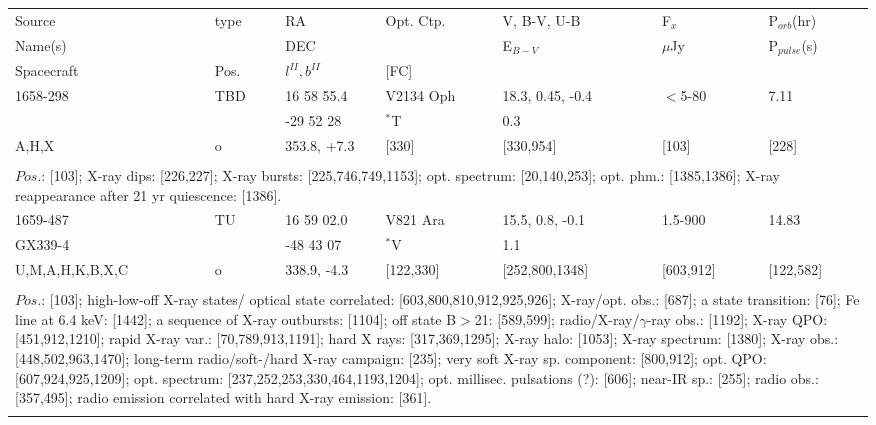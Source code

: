 \documentclass{aa}
\begin{document}
\begin{tabular}{p{2.5cm}p{1cm}p{1.8cm}p{2.3cm}p{3.3cm}p{2.0cm}p{2.2cm}}
\noalign{\smallskip}
\multicolumn{7}{p{17.5cm}}{Table 1.  (continued) }\\        
\hline
\noalign{\smallskip}
Source         & type  & RA                       &  Opt. Ctp. & V, B-V, U-B  & F$_{x}$          & P$_{orb}$(hr)    \\
Name(s)       &            & DEC                    &                     & E$_{B-V}$   & $\mu$Jy        & P$_{pulse}$(s) \\
Spacecraft & Pos.  & $l^{II}, b^{II}$      &  [FC]           &                        &                         &                             \\
\noalign{\smallskip} 
\hline

\noalign{\smallskip}
1658-298        & TBD         & 16 58 55.4          & V2134 Oph          & 18.3, 0.45, -0.4        & $<$5-80     & 7.11  \\
                         &                   & -29 52 28            & $^*$T                    & 0.3                             &                     &      \\
A,H,X              & o               & 353.8, +7.3          & [330]                     & [330,954]                  & [103]           & [228] \\
\\
\multicolumn{7}{p{17.5cm}}{
$Pos$.: [103]; X-ray dips: [226,227]; X-ray bursts: [225,746,749,1153]; opt. spectrum: [20,140,253]; opt. phm.: 
[1385,1386]; X-ray reappearance after 21 yr quiescence: [1386].}\\
\noalign{\smallskip}
\hline

\noalign{\smallskip}
1659-487                 & TU         & 16 59 02.0      & V821 Ara          & 15.5, 0.8, -0.1               & 1.5-900        & 14.83    \\
GX339-4                  &               & -48 43 07        & $^*$V                 & 1.1                                  &                       &         \\
U,M,A,H,K,B,X,C   & o            & 338.9, -4.3      & [122,330]           & [252,800,1348]            & [603,912]     & [122,582]        \\
\\
\multicolumn{7}{p{17.5cm}}{
$Pos$.: [103]; high-low-off X-ray states/ optical state correlated: [603,800,810,912,925,926]; X-ray/opt. obs.: [687]; 
a state transition: [76]; Fe line at 6.4 keV: [1442]; a sequence of X-ray outbursts: [1104]; off state B$>$21: [589,599]; 
radio/X-ray/$\gamma$-ray obs.: [1192]; X-ray QPO: [451,912,1210]; rapid X-ray var.: [70,789,913,1191]; hard X rays: 
[317,369,1295]; X-ray halo: [1053]; X-ray spectrum: [1380]; X-ray obs.: [448,502,963,1470]; long-term radio/soft-/hard 
X-ray campaign: [235]; very soft X-ray sp. component: [800,912]; opt. QPO: [607,924,925,1209]; opt. spectrum: 
[237,252,253,330,464,1193,1204]; opt. millisec. pulsations (?): [606]; near-IR sp.: [255]; radio obs.: [357,495]; radio 
emission correlated with hard X-ray emission: [361].}\\
\noalign{\smallskip}
\hline


\end{tabular}
\end{document}
